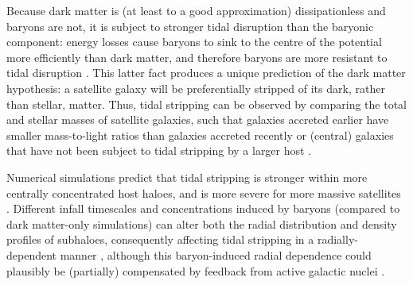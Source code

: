 Because dark matter is (at least to a good approximation) 
dissipationless and baryons are not, it is subject to stronger tidal disruption than the baryonic 
component: energy losses cause baryons to sink to the centre of the potential more efficiently 
than dark matter, and therefore baryons are more resistant to tidal disruption \citep{white78}. 
This latter fact produces a unique prediction of the dark matter hypothesis: a satellite galaxy 
will be preferentially stripped of its dark, rather than stellar, matter. Thus, tidal stripping can 
be observed by comparing the total and stellar masses of satellite galaxies, such that galaxies 
accreted earlier have smaller mass-to-light ratios than galaxies accreted recently or (central) 
galaxies that have not been subject to tidal stripping by a larger host \citep[e.g.,][]{chang13_stripping}.

Numerical simulations predict that tidal stripping is stronger within more centrally 
concentrated host haloes, and is more severe for more massive satellites 
\citep[e.g.,][]{tormen98,taffoni03,contini12}. Different infall timescales and concentrations 
induced by baryons (compared to dark matter-only simulations) can alter both the radial 
distribution and density profiles of subhaloes, consequently affecting tidal stripping in a 
radially-dependent manner \citep{romanodiaz10,schewtschenko11}, although this baryon-induced radial 
dependence could plausibly be (partially) compensated by feedback from active galactic nuclei 
\citep[AGN;][]{romanodiaz10}.

